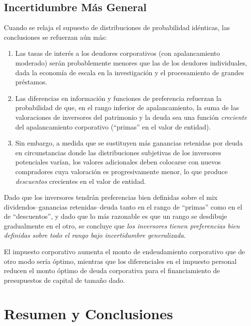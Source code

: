 \documentclass[12pt]{article}
\begin{document}
\subsection{Incertidumbre M\'as General}

Cuando se relaja el supuesto de distribuciones de probabilidad id\'enticas, las conclusiones se refuerzan a\'un m\'as:

\begin{enumerate}
  \item Las tasas de inter\'es a los deudores corporativos (con apalancamiento moderado) ser\'an probablemente menores que las de los deudores individuales, dada la econom\'ia de escala en la investigaci\'on y el procesamiento de grandes pr\'estamos.

  \item Las diferencias en informaci\'on y funciones de preferencia refuerzan la probabilidad de que, en el rango inferior de apalancamiento, la suma de las valoraciones de inversores del patrimonio y la deuda sea una funci\'on \textit{creciente} del apalancamiento corporativo (``primas'' en el valor de entidad).

  \item Sin embargo, a medida que se sustituyen m\'as ganancias retenidas por deuda en circunstancias donde las distribuciones subjetivas de los inversores potenciales var\'ian, los valores adicionales deben colocarse con nuevos compradores cuya valoraci\'on es progresivamente menor, lo que produce \textit{descuentos} crecientes en el valor de entidad.
\end{enumerate}

Dado que los inversores tendr\'an preferencias bien definidas sobre el mix dividendos--ganancias retenidas--deuda tanto en el rango de ``primas'' como en el de ``descuentos'', y dado que lo m\'as razonable es que un rango se desdibuje gradualmente en el otro, se concluye que \textit{los inversores tienen preferencias bien definidas sobre todo el rango bajo incertidumbre generalizada}.

El impuesto corporativo aumenta el monto de endeudamiento corporativo que de otro modo ser\'ia \'optimo, mientras que los diferenciales en el impuesto personal reducen el monto \'optimo de deuda corporativa para el financiamiento de presupuestos de capital de tama\~no dado.

\section{Resumen y Conclusiones}
\end{document}
